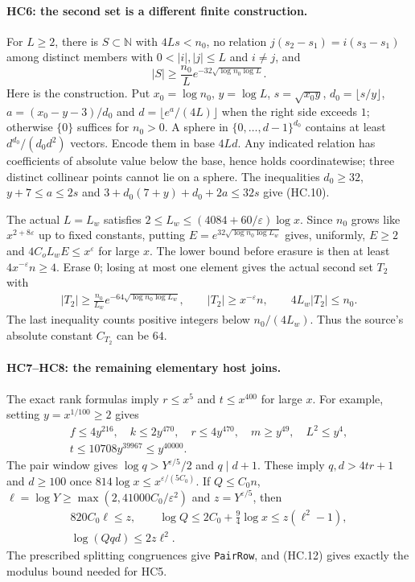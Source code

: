 \documentclass[11pt,a4paper]{article}
\numberwithin{equation}{section}
\theoremstyle{remark}\newtheorem{remark}[theorem]{Remark}
\begin{document}
\paragraph{HC6: the second set is a different finite construction.}
For $L\ge2$, there is $S\subset\mathbb N$ with $4Ls<n_0$,
no relation
$j(s_2-s_1)=i(s_3-s_1)$ among distinct members with
$0<|i|,|j|\le L$ and $i\ne j$, and
\[
 |S|\ge \frac{n_0}{L}
             e^{-32\sqrt{\log n_0\log L}}.           \tag{HC.10}
\]
Here is the construction. Put $x_0=\log n_0$, $y=\log L$,
$s=\sqrt{x_0y}$, $d_0=\lfloor s/y\rfloor$,
$a=(x_0-y-3)/d_0$ and
$d=\lfloor e^a/(4L)\rfloor$ when the right side exceeds $1$;
otherwise $\{0\}$ suffices for $n_0>0$.
A sphere in $\{0,\ldots,d-1\}^{d_0}$ contains at least
$d^{d_0}/(d_0d^2)$ vectors. Encode them in base $4Ld$.
Any indicated relation has coefficients of absolute value below
the base, hence holds coordinatewise; three distinct collinear
points cannot lie on a sphere. The inequalities
$d_0\ge32$, $y+7\le a\le2s$ and
$3+d_0(7+y)+d_0+2a\le32s$ give (HC.10).

The actual $L=L_w$ satisfies
$2\le L_w\le(4084+60/\varepsilon)\log x$.
Since $n_0$ grows like $x^{2+8\varepsilon}$ up to fixed constants,
putting $E=e^{32\sqrt{\log n_0\log L_w}}$ gives, uniformly,
$E\ge2$ and $4C_oL_wE\le x^\varepsilon$ for large $x$.
The lower bound before erasure is then at least
$4x^{-\varepsilon}n\ge4$. Erase $0$; losing at most one element
gives the actual second set $T_2$ with
\[
 \begin{gathered}
 |T_2|\ge\frac{n_0}{L_w}
       e^{-64\sqrt{\log n_0\log L_w}},\qquad
 |T_2|\ge x^{-\varepsilon}n,\qquad
 4L_w|T_2|\le n_0.
 \end{gathered}                                      \tag{HC.11}
\]
The last inequality counts positive integers below $n_0/(4L_w)$.
Thus the source's absolute constant $C_{T_2}$ can be $64$.

\paragraph{HC7--HC8: the remaining elementary host joins.}
The exact rank formulas imply $r\le x^5$ and $t\le x^{400}$
for large $x$. For example, setting $y=x^{1/100}\ge2$ gives
\[
 \begin{gathered}
 f\le4y^{216},\quad k\le2y^{470},\quad r\le4y^{470},
 \quad m\ge y^{49},\quad L^2\le y^4,\\
 t\le10708y^{39967}\le y^{40000}.
 \end{gathered}
\]
The pair window gives $\log q>Y^{\varepsilon/5}/2$ and $q\mid d+1$.
These imply $q,d>4tr+1$ and $d\ge100$ once
$814\log x\le x^{\varepsilon/(5C_0)}$.
If $Q\le C_0n$, $\ell=\log Y\ge\max(2,41000C_0/\varepsilon^2)$
and $z=Y^{\varepsilon/5}$, then
\[
 \begin{gathered}
 820C_0\ell\le z,\qquad
 \log Q\le2C_0+\tfrac94\log x\le z(\ell^2-1),\\
 \log(Qqd)\le2z\ell^2.
 \end{gathered}                                      \tag{HC.12}
\]
The prescribed splitting congruences give \texttt{PairRow}, and
(HC.12) gives exactly the modulus bound needed for HC5.
\end{document}
